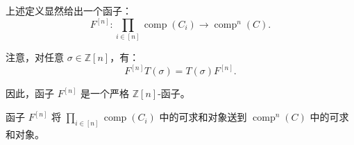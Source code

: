 上述定义显然给出一个函子：
\begin{equation}
  F^{[n]}\colon
  \prod_{i\in[n]}\operatorname{comp}(C_i)
  \longrightarrow \operatorname{comp}^{n}(C).
  \tag{2.4.2.4}
\end{equation}

注意，对任意 $\sigma\in\mathbb Z[n]$，有：
\begin{equation}
  F^{[n]}T(\sigma)=T(\sigma)F^{[n]}.
  \tag{2.4.2.5}
\end{equation}

因此，函子 $F^{[n]}$ 是一个严格 $\mathbb Z[n]$-函子。

函子 $F^{[n]}$ 将
$\prod_{i\in[n]}\operatorname{comp}(C_i)$ 中的可求和对象送到
$\operatorname{comp}^{n}(C)$ 中的可求和对象。
